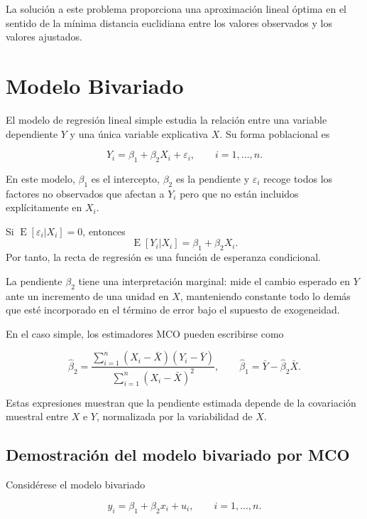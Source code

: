 \documentclass[11pt,a4paper]{article}
\DeclareMathOperator{\E}{E}
\begin{document}
La solución a este problema proporciona una aproximación lineal óptima en el sentido de la mínima distancia euclidiana entre los valores observados y los valores ajustados.

\section{Modelo Bivariado}

El modelo de regresión lineal simple estudia la relación entre una variable dependiente \(Y\) y una única variable explicativa \(X\). Su forma poblacional es

\[
Y_i = \beta_1 + \beta_2X_i + \varepsilon_i, \qquad i=1,\dots,n.
\]

En este modelo, \(\beta_1\) es el intercepto, \(\beta_2\) es la pendiente y \(\varepsilon_i\) recoge todos los factores no observados que afectan a \(Y_i\) pero que no están incluidos explícitamente en \(X_i\).

\begin{resultado}
Si \(\E[\varepsilon_i|X_i]=0\), entonces
\[
\E[Y_i|X_i]=\beta_1+\beta_2X_i.
\]
Por tanto, la recta de regresión es una función de esperanza condicional.
\end{resultado}

La pendiente \(\beta_2\) tiene una interpretación marginal: mide el cambio esperado en \(Y\) ante un incremento de una unidad en \(X\), manteniendo constante todo lo demás que esté incorporado en el término de error bajo el supuesto de exogeneidad.

En el caso simple, los estimadores MCO pueden escribirse como

\[
\hat{\beta}_2 = \frac{\sum_{i=1}^{n}(X_i-\bar{X})(Y_i-\bar{Y})}{\sum_{i=1}^{n}(X_i-\bar{X})^2},
\qquad
\hat{\beta}_1 = \bar{Y}-\hat{\beta}_2\bar{X}.
\]

Estas expresiones muestran que la pendiente estimada depende de la covariación muestral entre \(X\) e \(Y\), normalizada por la variabilidad de \(X\).

\subsection{Demostración del modelo bivariado por MCO}

Considérese el modelo bivariado

\[
y_i = \beta_1+\beta_2x_i+u_i,
\qquad i=1,\dots,n.
\]
\end{document}
